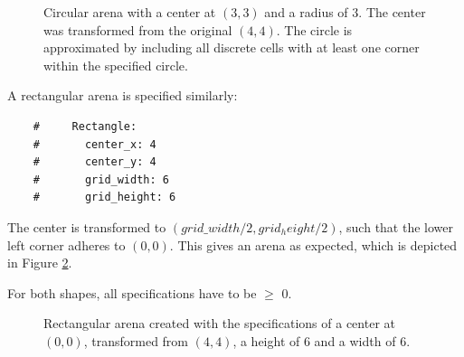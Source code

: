 \begin{figure}[htb]
	\begin{center}
	\end{center}
	\caption{Circular arena with a center at $(3, 3)$ and a radius of $3$. The center was transformed from the original $(4,4)$. The circle is approximated by including all discrete cells with at least one corner within the specified circle.}
	\label{fig:circular_arena}
\end{figure}

A rectangular arena is specified similarly:

\begin{verbatim}
	#     Rectangle:
	#       center_x: 4
	#       center_y: 4
	#       grid_width: 6
	#       grid_height: 6
\end{verbatim}

The center is transformed to $(grid\_width/2,grid_height/2)$, such that the lower left corner adheres to $(0,0)$. This gives an arena as expected, which is depicted in Figure \ref{fig:rect_arena}.

For both shapes, all specifications have to be $\geq$ 0.

\begin{figure}[htb]
	\centering
	\caption{Rectangular arena created with the specifications of a center at $(0,0)$, transformed from $(4,4)$, a height of $6$ and a width of $6$.}
	\label{fig:rect_arena}
\end{figure}



